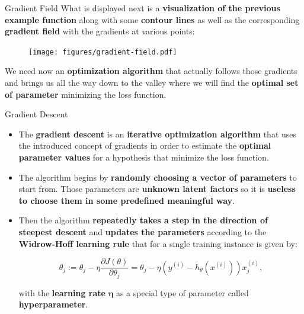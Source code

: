 \documentclass[document.tex]{subfiles}
\begin{document}
    \begin{frame}{Gradient Field}
        What is displayed next is a \textbf{visualization of the previous example function} along with some \textbf{contour lines} as well as the corresponding \textbf{gradient field} with the gradients at various points:
        
        \begin{figure}
            \label{fig:gradient-field}
            \texttt{[image: figures/gradient-field.pdf]}
        \end{figure}
        
        \vspace*{-3mm}
        We need now an \textbf{optimization algorithm} that actually follows those gradients and brings us all the way down to the valley where we will find the \textbf{optimal set of parameter} minimizing the loss function. 
    \end{frame}

    \begin{frame}{Gradient Descent}
        \begin{itemize}
            \item The \textbf{gradient descent} is an \textbf{iterative optimization algorithm} that uses the introduced concept of gradients in order to estimate the \textbf{optimal parameter values} for a hypothesis that minimize the loss function.
            \item The algorithm begins by \textbf{randomly choosing a vector of parameters} to start from. Those parameters are \textbf{unknown latent factors} so it is \textbf{useless to choose them in some predefined meaningful way}.
            \item Then the algorithm \textbf{repeatedly takes a step in the direction of steepest descent} and \textbf{updates the parameters} according to the \textbf{Widrow-Hoff learning rule} that for a single training instance is given by:
            
            $$\theta_j := \theta_j - \eta \frac{\partial J(\theta)}{\partial \theta_j} = \theta_j - \eta (y^{(i)} - h_\theta(x^{(i)}))x^{(i)}_j,$$
            
            with the \textbf{learning rate} $\pmb{\eta}$ as a special type of parameter called \textbf{hyperparameter}.
        \end{itemize}
    \end{frame}	
\end{document}

